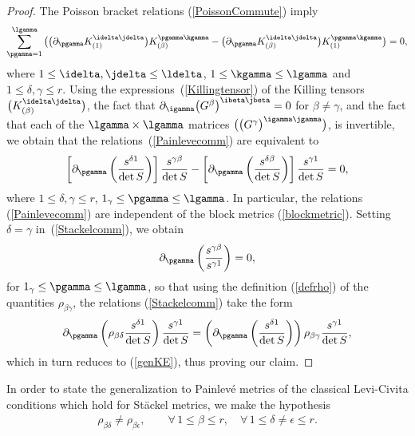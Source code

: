 \begin{proof}The Poisson bracket relations (\ref{PoissonCommute}) imply
\begin{gather}\label{Painlevecomm}
\sum_{\pgamma=1}^{\lgamma}\big(\big(\partial_{\pgamma} K_{(1)}^{\idelta \jdelta}\big) K_{(\beta)}^{\pgamma \kgamma}-\big(\partial_{\pgamma} K_{(\beta)}^{\idelta \jdelta}\big) K_{(1)}^{\pgamma \kgamma}\big)=0,
\end{gather}
where $1\leq \idelta, \jdelta \leq \ldelta$, $1\leq \kgamma \leq \lgamma$ and $1\leq \delta, \gamma \leq r$. Using the expressions~(\ref{Killingtensor}) of the Killing tensors $\big(K_{(\beta)}^{\idelta \jdelta}\big)$, the fact that $\partial_{\igamma}\big(G^{\beta}\big)^{\ibeta \jbeta}=0$ for $\beta \neq \gamma$, and the fact that each of the $\lgamma \times \lgamma$ matrices $\big(\big(G^{\gamma}\big)^{\igamma \jgamma}\big)$, is invertible, we obtain that the relations~(\ref{Painlevecomm}) are equivalent to
\begin{gather}\label{Stackelcomm}
\left[\partial_{\pgamma}\left(\frac{s^{\delta 1}}{\det S}\right)\right] \frac{s^{\gamma \beta}}{\det S}-\left[\partial_{\pgamma}\left(\frac{s^{\delta \beta}}{\det S}\right)\right] \frac{s^{\gamma 1}}{\det S}=0,
\end{gather}
where $1\leq \delta, \gamma \leq r$, $1_{\gamma}\leq \pgamma \leq \lgamma $. In particular, the relations (\ref{Painlevecomm}) are independent of the block metrics (\ref{blockmetric}). Setting $\delta = \gamma$ in~(\ref{Stackelcomm}), we obtain
\[
\partial_{\pgamma}\left(\frac{s^{\gamma \beta}}{s^{\gamma 1}}\right)=0,
\]
for $1_{\gamma}\leq \pgamma \leq \lgamma$, so that using the definition (\ref{defrho}) of the quantities $\rho_{\beta \gamma}$, the relations (\ref{Stackelcomm}) take the form
\[
\partial_{\pgamma}\left(\rho_{ \beta \delta}\frac{s^{\delta 1}}{\det S}\right)\frac{s^{\gamma 1}}{\det S}=\left(\partial_{\pgamma}\left(\frac{s^{\delta 1}}{\det S}\right)\right)\rho_{\beta \gamma} \frac{s^{\gamma 1}}{\det S},
\]
which in turn reduces to (\ref{genKE}), thus proving our claim.
\end{proof}

In order to state the generalization to Painlev\'e metrics of the classical Levi-Civita conditions which hold for St\"ackel metrics, we make the hypothesis
\begin{gather}\label{H}
\rho_{\beta \delta}\neq \rho_{\beta \epsilon},\qquad \forall\, 1\leq \beta \leq r,\quad \forall\, 1\leq \delta\neq \epsilon \leq r.
\end{gather}

